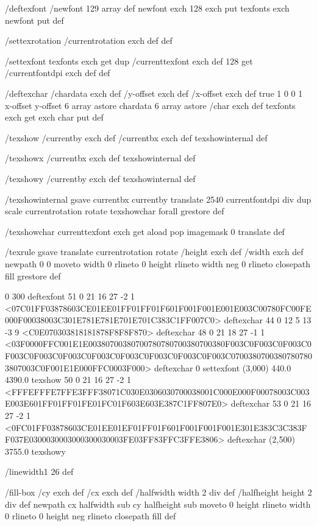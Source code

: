 /deftexfont
 { /newfont 129 array def
   newfont exch 128 exch put
   texfonts exch newfont put } def

/settexrotation
 { /currentrotation exch def } def

/settexfont
 { texfonts exch get dup /currenttexfont exch def
   128 get /currentfontdpi exch def } def

/deftexchar
 { /chardata exch def
   /y-offset exch def
   /x-offset exch def
   true
   1 0 0 1 x-offset y-offset 6 array astore
   chardata
   6 array astore /char exch def
   texfonts exch get exch char put } def

/texshow
 { /currentby exch def
   /currentbx exch def
   texshowinternal } def

/texshowx
 { /currentbx exch def
   texshowinternal } def

/texshowy
 { /currentby exch def
   texshowinternal } def

/texshowinternal
 { gsave
   currentbx currentby translate
   2540 currentfontdpi div dup scale
   currentrotation rotate
   {texshowchar} forall
   grestore } def

/texshowchar
   { currenttexfont exch get aload pop imagemask 0 translate } def

/texrule
 { gsave
   translate
   currentrotation rotate
   /height exch def
   /width exch def
   newpath
    0 0 moveto
    width 0 rlineto
    0 height rlineto
    width neg 0 rlineto
    closepath
    fill
   grestore } def

0 300 deftexfont
51 0 21 16 27 -2 1 {{<07C01FF03878603CE01EE01FF01FF01F601F001F001E001E003C00780FC00FE000F00038003C301E781E781E701E701C383C1FF007C0>}} deftexchar
44 0 12 5 13 -3 9 {{<C0E070303818181878F8F8F870>}} deftexchar
48 0 21 18 27 -1 1 {{<03F0000FFC001E1E00380700380700780780700380700380F003C0F003C0F003C0F003C0F003C0F003C0F003C0F003C0F003C0F003C0F003C07003807003807807803807003C0F001E1E000FFC0003F000>}} deftexchar
0 settexfont
(3,000) 440.0 4390.0 texshow
50 0 21 16 27 -2 1 {{<FFFEFFFE7FFE3FFF38071C030E0306030700038001C000E000F00078003C003E003E601FF01FF01FE01FC01F603E603E387C1FF807E0>}} deftexchar
53 0 21 16 27 -2 1 {{<0FC01FF03878603CE01EE01EF01FF01F601F001F001F001E301E383C3C383FF037E0300030003000300030003FE03FF83FFC3FFE3806>}} deftexchar
(2,500) 3755.0 texshowy



/linewidth1 26 def

/fill-box
  { /cy exch def /cx exch def
    /halfwidth width 2 div def
    /halfheight height 2 div def
    newpath
     cx halfwidth sub cy halfheight sub moveto
     0 height rlineto
     width 0 rlineto
     0 height neg rlineto
     closepath
     fill } def

